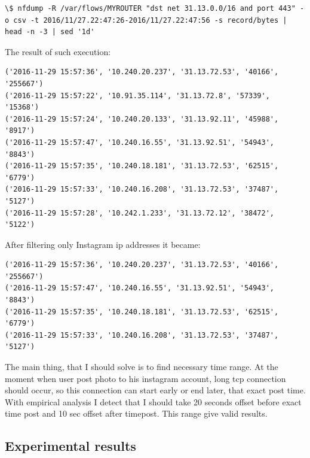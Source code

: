 \begin{lstlisting}
\$ nfdump -R /var/flows/MYROUTER "dst net 31.13.0.0/16 and port 443" -o csv -t 2016/11/27.22:47:26-2016/11/27.22:47:56 -s record/bytes | head -n -3 | sed '1d'
\end{lstlisting}

The result of such execution:

\begin{lstlisting}
('2016-11-29 15:57:36', '10.240.20.237', '31.13.72.53', '40166', '255667')
('2016-11-29 15:57:22', '10.91.35.114', '31.13.72.8', '57339', '15368')
('2016-11-29 15:57:24', '10.240.20.133', '31.13.92.11', '45988', '8917')
('2016-11-29 15:57:47', '10.240.16.55', '31.13.92.51', '54943', '8843')
('2016-11-29 15:57:35', '10.240.18.181', '31.13.72.53', '62515', '6779')
('2016-11-29 15:57:33', '10.240.16.208', '31.13.72.53', '37487', '5127')
('2016-11-29 15:57:28', '10.242.1.233', '31.13.72.12', '38472', '5122')
\end{lstlisting}

After filtering only Instagram ip addresses it became:

\begin{lstlisting}
('2016-11-29 15:57:36', '10.240.20.237', '31.13.72.53', '40166', '255667')
('2016-11-29 15:57:47', '10.240.16.55', '31.13.92.51', '54943', '8843')
('2016-11-29 15:57:35', '10.240.18.181', '31.13.72.53', '62515', '6779')
('2016-11-29 15:57:33', '10.240.16.208', '31.13.72.53', '37487', '5127')
\end{lstlisting}

The main thing, that I should solve is to find necessary time range. At the moment when user post photo to his instagram account, long tcp connection should occur, so this connection can start early or end later, that exact post time. With empirical analysis I detect that I should take 20 seconds offset before exact time post and 10 sec offset after timepost. This range give valid results.

\subsection{Experimental results}

